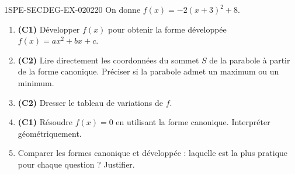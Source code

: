 \begin{exercice}{1SPE-SECDEG-EX-020}{2}{20}
On donne $f(x) = -2(x+3)^2 + 8$.

\begin{enumerate}
  \item \textbf{(C1)} Développer $f(x)$ pour obtenir la forme développée $f(x) = ax^2 + bx + c$.
  \item \textbf{(C2)} Lire directement les coordonnées du sommet $S$ de la parabole à partir de la forme canonique. Préciser si la parabole admet un maximum ou un minimum.
  \item \textbf{(C2)} Dresser le tableau de variations de $f$.
  \item \textbf{(C1)} Résoudre $f(x) = 0$ en utilisant la forme canonique. Interpréter géométriquement.
  \item Comparer les formes canonique et développée : laquelle est la plus pratique pour chaque question ? Justifier.
\end{enumerate}
\end{exercice}
